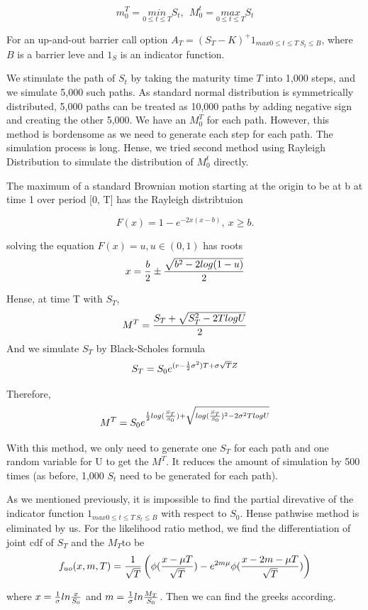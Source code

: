 \documentclass[11pt,a4paper,fleqn,draft]{article}
\begin{document}
$$m^T_{0} =\underset{0 \leq t \leq T}{min}  S_t, \ \   M^t_{0} = \underset{0 \leq t \leq T}{max} S_t$$

For an up-and-out barrier call option $A_T=(S_T-K)^+1_{max 0\leq t\leq T \  S_t\leq B}$, where $B$ is a barrier leve and $1_S$ is an indicator function.

We stimulate the path of $S_t$ by taking the maturity time $T$ into 1,000 steps, and we simulate 5,000 such paths. As standard normal distribution is symmetrically distributed, 5,000 paths can be treated as 10,000 paths by adding negative sign and creating the other 5,000. We have an $M^T_0$ for each path. However, this method is bordensome as we need to generate each step for each path. The simulation process is long. Hense, we tried second method using Rayleigh Distribution to simulate the distribution of $M^t_0$ directly. 

The maximum of a standard Brownian motion starting at the origin to be at b at time 1 over period [0, T] has the Rayleigh distribtuion \cite{lectures, barrieropt}

$$F(x) = 1 - e^{-2x(x-b)}, \ x \geq b.$$

solving the equation $F(x) = u, u\in (0,1)$ has roots
$$x = {b \over 2} \pm {\sqrt{b^2-2log(1-u)}\over 2}$$

Hense, at time T with $S_T$, 
$$M^T={S_T+\sqrt{S_T^2-2TlogU}\over 2}$$
And we simulate $S_T$ by Black-Scholes formula
$$S_T=S_0e^{(r-{1\over 2}\sigma^2)T+\sigma \sqrt{T}Z}$$

Therefore, 
$$M^T=S_0e^{{1\over2}log({S_T\over S_0})+\sqrt{log({S_T\over S_0})^2-2\sigma^2TlogU}}$$

With this method, we only need to generate one $S_T$ for each path and one random variable for U to get the $M^T$. It reduces the amount of simulation by 500 times (as before, 1,000 $S_t$ need to be generated for each path).

As we mentioned previously, it is impossible to find the partial direvative of the indicator function $1_{max 0\leq t\leq T \  S_t\leq B}$  with respect to $S_0$. Hense pathwise method is eliminated by us. For the likelihood ratio method, we find the differentiation of joint cdf of $S_T$ and the  $M_T $to be 
$$f_{uo}(x, m, T)={1\over \sqrt{T}}\left(\phi({x-\mu T \over \sqrt{T}})-e^{2m\mu} \phi({x-2m-\mu T\over \sqrt{T}})\right) $$

where $x = {1\over \sigma}ln {x\over S_0}$ and $m = {1\over \sigma}ln {M_T\over S_0}$. Then we can find the greeks according.
\end{document}
